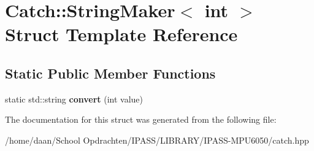 \hypertarget{structCatch_1_1StringMaker_3_01int_01_4}{}\section{Catch\+:\+:String\+Maker$<$ int $>$ Struct Template Reference}
\label{structCatch_1_1StringMaker_3_01int_01_4}
\subsection*{Static Public Member Functions}
\begin{DoxyCompactItemize}
\item 
\mbox{\label{structCatch_1_1StringMaker_3_01int_01_4_aab096e55fb7283f6ad47b5ca277e22e8}} 
static std\+::string {\bfseries convert} (int value)
\end{DoxyCompactItemize}


The documentation for this struct was generated from the following file\+:\begin{DoxyCompactItemize}
\item 
/home/daan/\+School Opdrachten/\+I\+P\+A\+S\+S/\+L\+I\+B\+R\+A\+R\+Y/\+I\+P\+A\+S\+S-\/\+M\+P\+U6050/catch.\+hpp\end{DoxyCompactItemize}
